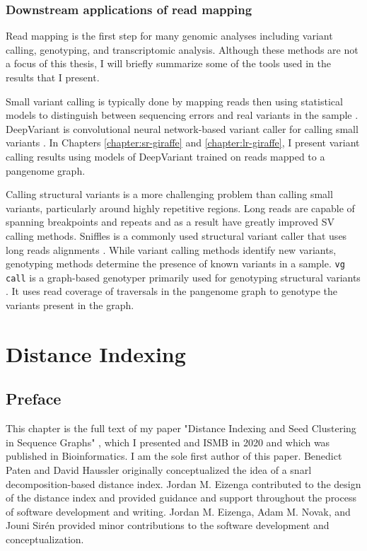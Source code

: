 \documentclass[11pt]{ucscthesis}
\begin{document}
\subsection{Downstream applications of read mapping}

Read mapping is the first step for many genomic analyses including variant calling, genotyping, and transcriptomic analysis. 
Although these methods are not a focus of this thesis, I will briefly summarize some of the tools used in the results that I present.

Small variant calling is typically done by mapping reads then using statistical models to distinguish between sequencing errors and real variants in the sample \cite{bonfiglio_calling_2024}.
DeepVariant is convolutional neural network-based variant caller for calling small variants \cite{deep_variant_2018}. 
In Chapters \ref{chapter:sr-giraffe} and \ref{chapter:lr-giraffe}, I present variant calling results using models of DeepVariant trained on reads mapped to a pangenome graph.

Calling structural variants is a more challenging problem than calling small variants, particularly around highly repetitive regions.
Long reads are capable of spanning breakpoints and repeats and as a result have greatly improved SV calling methods.
Sniffles is a commonly used structural variant caller that uses long reads alignments \cite{smolka_sniffles2_2024}.
While variant calling methods identify new variants, genotyping methods determine the presence of known variants in a sample.
\texttt{vg call} is a graph-based genotyper primarily used for genotyping structural variants \cite{hickey_vgsv_2020}.
It uses read coverage of traversals in the pangenome graph to genotype the variants present in the graph.


\chapter{Distance Indexing}
\label{chapter:distance}

\section{Preface}
This chapter is the full text of my paper "Distance Indexing and Seed Clustering in Sequence Graphs" \cite{chang_distance_2020}, which I presented and ISMB in 2020 and which was published in Bioinformatics.
I am the sole first author of this paper. 
Benedict Paten and David Haussler originally conceptualized the idea of a snarl decomposition-based distance index.
Jordan M. Eizenga contributed to the design of the distance index and provided guidance and support throughout the process of software development and writing.
Jordan M. Eizenga, Adam M. Novak, and Jouni Sirén provided minor contributions to the software development and conceptualization. 
\end{document}
